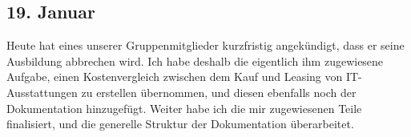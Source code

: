 \subsection{19. Januar}
Heute hat eines unserer Gruppenmitglieder kurzfristig angekündigt, dass er seine Ausbildung abbrechen wird. Ich habe deshalb die eigentlich ihm zugewiesene Aufgabe, einen Kostenvergleich zwischen dem Kauf und Leasing von IT-Ausstattungen zu erstellen übernommen, und diesen ebenfalls noch der Dokumentation hinzugefügt. Weiter habe ich die mir zugewiesenen Teile finalisiert, und die generelle Struktur der Dokumentation überarbeitet.
